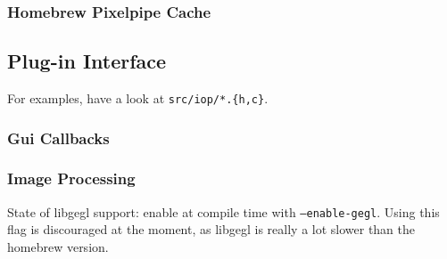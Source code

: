 \documentclass[a4paper,twoside]{scrartcl}
\newcommand{\code}[1]{\texttt{\color{codecol}#1}}
\begin{document}
\subsubsection{Homebrew Pixelpipe Cache}

\subsection{Plug-in Interface}

For examples, have a look at \code{src/iop/*.\{h,c\}}.

\subsubsection{Gui Callbacks}

\subsubsection{Image Processing}

State of libgegl support: enable at compile time with \texttt{--enable-gegl}. Using this
flag is discouraged at the moment, as libgegl is really a lot slower than the homebrew version.
\end{document}
